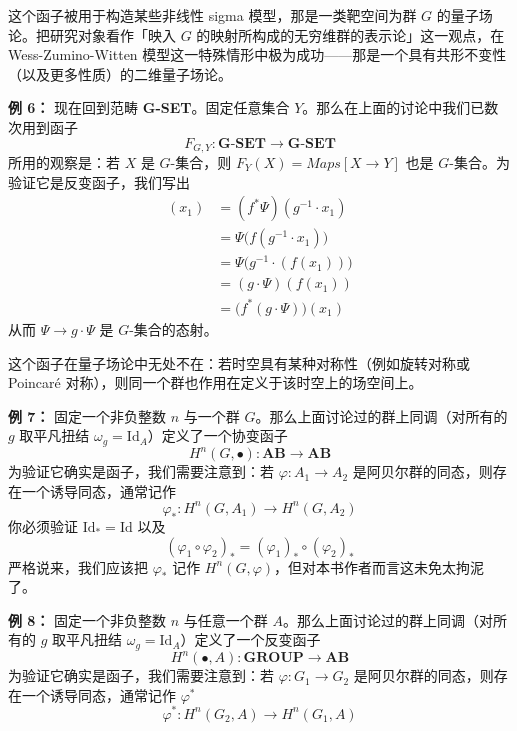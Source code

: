 这个函子被用于构造某些非线性 sigma 模型，那是一类靶空间为群 $G$ 的量子场论。把研究对象看作「映入 $G$ 的映射所构成的无穷维群的表示论」这一观点，在 Wess-Zumino-Witten 模型这一特殊情形中极为成功——那是一个具有共形不变性（以及更多性质）的二维量子场论。

\textbf{例 6：} 现在回到范畴 \textbf{G-SET}。固定任意集合 $Y$。那么在上面的讨论中我们已数次用到函子
\begin{equation}
F_{G,Y}:\textbf{G-SET}\to\textbf{G-SET}
\tag{K.16}
\label{eq:K.16}
\end{equation}
所用的观察是：若 $X$ 是 $G$-集合，则 $F_Y(X)=\mathit{Maps}[X\to Y]$ 也是 $G$-集合。为验证它是反变函子，我们写出
\begin{align*}
[g\cdot(f^*\Psi)](x_1)&=(f^*\Psi)(g^{-1}\cdot x_1)\\
&=\Psi\big(f(g^{-1}\cdot x_1)\big)\\
&=\Psi\big(g^{-1}\cdot(f(x_1))\big)\\
&=(g\cdot\Psi)(f(x_1))\tag{K.17}\label{eq:K.17}\\
&=\big(f^*(g\cdot\Psi)\big)(x_1)
\end{align*}
从而 $\Psi\to g\cdot\Psi$ 是 $G$-集合的态射。

这个函子在量子场论中无处不在：若时空具有某种对称性（例如旋转对称或 Poincaré 对称），则同一个群也作用在定义于该时空上的场空间上。

\textbf{例 7：} 固定一个非负整数 $n$ 与一个群 $G$。那么上面讨论过的群上同调（对所有的 $g$ 取平凡扭结 $\omega_g=\mathrm{Id}_A$）定义了一个协变函子
\begin{equation}
H^n(G,\bullet):\textbf{AB}\to\textbf{AB}
\tag{K.18}
\label{eq:K.18}
\end{equation}
为验证它确实是函子，我们需要注意到：若 $\varphi:A_1\to A_2$ 是阿贝尔群的同态，则存在一个诱导同态，通常记作
\begin{equation}
\varphi_*:H^n(G,A_1)\to H^n(G,A_2)
\tag{K.19}
\label{eq:K.19}
\end{equation}
你必须验证 $\mathrm{Id}_*=\mathrm{Id}$ 以及
\begin{equation}
(\varphi_1\circ\varphi_2)_*=(\varphi_1)_*\circ(\varphi_2)_*
\tag{K.20}
\label{eq:K.20}
\end{equation}
严格说来，我们应该把 $\varphi_*$ 记作 $H^n(G,\varphi)$，但对本书作者而言这未免太拘泥了。

\textbf{例 8：} 固定一个非负整数 $n$ 与任意一个群 $A$。那么上面讨论过的群上同调（对所有的 $g$ 取平凡扭结 $\omega_g=\mathrm{Id}_A$）定义了一个反变函子
\begin{equation}
H^n(\bullet,A):\textbf{GROUP}\to\textbf{AB}
\tag{K.21}
\label{eq:K.21}
\end{equation}
为验证它确实是函子，我们需要注意到：若 $\varphi:G_1\to G_2$ 是阿贝尔群的同态，则存在一个诱导同态，通常记作 $\varphi^*$
\begin{equation}
\varphi^*:H^n(G_2,A)\to H^n(G_1,A)
\tag{K.22}
\label{eq:K.22}
\end{equation}

